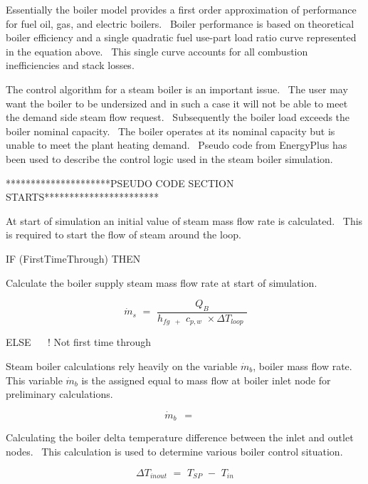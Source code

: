 Essentially the boiler model provides a first order approximation of performance for fuel oil, gas, and electric boilers.~ Boiler performance is based on theoretical boiler efficiency and a single quadratic fuel use-part load ratio curve represented in the equation above.~ This single curve accounts for all combustion inefficiencies and stack losses.

The control algorithm for a steam boiler is an important issue.~ The user may want the boiler to be undersized and in such a case it will not be able to meet the demand side steam flow request.~ Subsequently the boiler load exceeds the boiler nominal capacity.~ The boiler operates at its nominal capacity but is unable to meet the plant heating demand.~ Pseudo code from EnergyPlus has been used to describe the control logic used in the steam boiler simulation.

*********************PSEUDO CODE SECTION STARTS***********************

At start of simulation an initial value of steam mass flow rate is calculated.~ This is required to start the flow of steam around the loop.

IF (FirstTimeThrough) THEN

Calculate the boiler supply steam mass flow rate at start of simulation.

\begin{equation}
\,{\dot m_s}\,\, = \,\,\frac{{{Q_B}}}{{{h_{fg\,\,\, + }}\,\,{c_{p,w}}\,\, \times \Delta {T_{loop}}\,\,}}
\end{equation}

ELSE ~~ ! Not first time through

Steam boiler calculations rely heavily on the variable \(\dot m\)\(_{b}\), boiler mass flow rate.~ This variable \(\dot m_{b}\) is the assigned equal to mass flow at boiler inlet node for preliminary calculations.

\begin{equation}
\,{\dot m_b}\,\,\, = \,\,\,\mathop {\,{{\dot m}_{InletNode}}}\limits^{}
\end{equation}

Calculating the boiler delta temperature difference between the inlet and outlet nodes.~ This calculation is used to determine various boiler control situation.

\begin{equation}
\Delta {T_{inout}}\,\, = \,\,{T_{SP}}\,\, - \,\,{T_{in}}
\label{eq:DeltaTofSteamBoiler}
\end{equation}

